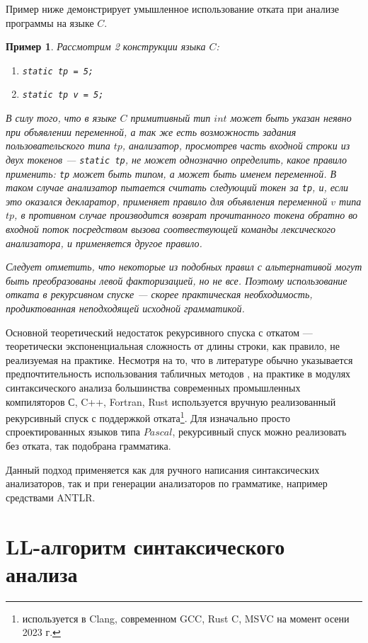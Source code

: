 \documentclass[10pt]{article}         %
\newtheorem{example}{Пример}
\begin{document}
	Пример ниже демонстрирует умышленное использование отката при анализе программы на языке $C$.
	\begin{example}
	Рассмотрим 2 конструкции языка $C$:
	\begin{enumerate}
		\item \verb|static tp = 5;|
		\item \verb|static tp v = 5;|
	\end{enumerate}
	В силу того, что в языке $C$ примитивный тип $int$ может быть указан неявно при объявлении переменной, а так же есть возможность задания пользовательского типа $tp$, анализатор, просмотрев часть входной строки из двух токенов --- \verb|static tp|, не может однозначно определить, какое правило применить: \verb|tp| может быть типом, а может быть именем переменной. В таком случае анализатор пытается считать следующий токен за \verb|tp|, и, если это оказался декларатор, применяет правило для объявления переменной $v$ типа $tp$, в противном случае производится возврат прочитанного токена обратно во входной поток посредством вызова соотвествующей команды лексического анализатора, и применяется другое правило.
	
	Следует отметить, что некоторые из подобных правил с альтернативой могут быть преобразованы левой факторизацией, но не все. Поэтому использование отката в рекурсивном спуске --- скорее практическая необходимость, продиктованная неподходящей исходной грамматикой.
	
	\end{example}
	Основной теоретический недостаток рекурсивного спуска с откатом --- теоретически экспоненциальная сложность от длины строки, как правило, не реализуемая на практике.
	Несмотря на то, что в литературе обычно указывается предпочтительность использования табличных методов \cite{}, на практике в модулях синтаксического анализа большинства современных промышленных компиляторов С, C++, Fortran, Rust используется вручную реализованный рекурсивный спуск с поддержкой отката\footnote{используется в Clang, современном GCC, Rust C, MSVC на момент осени 2023 г.}. Для изначально просто спроектированных языков типа $Pascal$, рекурсивный спуск можно реализовать без отката, так подобрана грамматика.
	
	Данный подход применяется как для ручного написания синтаксических анализаторов, так и при генерации анализаторов по грамматике, например средствами ANTLR. 
	
	\section{LL-алгоритм синтаксического анализа}
	
\end{document}
